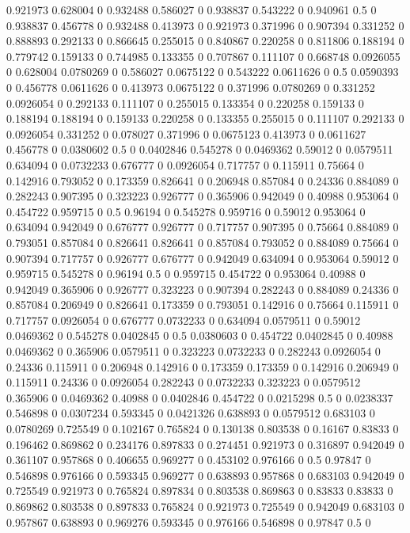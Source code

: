 0.921973 0.628004 0
0.932488 0.586027 0
0.938837 0.543222 0
0.940961 0.5 0
0.938837 0.456778 0
0.932488 0.413973 0
0.921973 0.371996 0
0.907394 0.331252 0
0.888893 0.292133 0
0.866645 0.255015 0
0.840867 0.220258 0
0.811806 0.188194 0
0.779742 0.159133 0
0.744985 0.133355 0
0.707867 0.111107 0
0.668748 0.0926055 0
0.628004 0.0780269 0
0.586027 0.0675122 0
0.543222 0.0611626 0
0.5 0.0590393 0
0.456778 0.0611626 0
0.413973 0.0675122 0
0.371996 0.0780269 0
0.331252 0.0926054 0
0.292133 0.111107 0
0.255015 0.133354 0
0.220258 0.159133 0
0.188194 0.188194 0
0.159133 0.220258 0
0.133355 0.255015 0
0.111107 0.292133 0
0.0926054 0.331252 0
0.078027 0.371996 0
0.0675123 0.413973 0
0.0611627 0.456778 0
0.0380602 0.5 0
0.0402846 0.545278 0
0.0469362 0.59012 0
0.0579511 0.634094 0
0.0732233 0.676777 0
0.0926054 0.717757 0
0.115911 0.75664 0
0.142916 0.793052 0
0.173359 0.826641 0
0.206948 0.857084 0
0.24336 0.884089 0
0.282243 0.907395 0
0.323223 0.926777 0
0.365906 0.942049 0
0.40988 0.953064 0
0.454722 0.959715 0
0.5 0.96194 0
0.545278 0.959716 0
0.59012 0.953064 0
0.634094 0.942049 0
0.676777 0.926777 0
0.717757 0.907395 0
0.75664 0.884089 0
0.793051 0.857084 0
0.826641 0.826641 0
0.857084 0.793052 0
0.884089 0.75664 0
0.907394 0.717757 0
0.926777 0.676777 0
0.942049 0.634094 0
0.953064 0.59012 0
0.959715 0.545278 0
0.96194 0.5 0
0.959715 0.454722 0
0.953064 0.40988 0
0.942049 0.365906 0
0.926777 0.323223 0
0.907394 0.282243 0
0.884089 0.24336 0
0.857084 0.206949 0
0.826641 0.173359 0
0.793051 0.142916 0
0.75664 0.115911 0
0.717757 0.0926054 0
0.676777 0.0732233 0
0.634094 0.0579511 0
0.59012 0.0469362 0
0.545278 0.0402845 0
0.5 0.0380603 0
0.454722 0.0402845 0
0.40988 0.0469362 0
0.365906 0.0579511 0
0.323223 0.0732233 0
0.282243 0.0926054 0
0.24336 0.115911 0
0.206948 0.142916 0
0.173359 0.173359 0
0.142916 0.206949 0
0.115911 0.24336 0
0.0926054 0.282243 0
0.0732233 0.323223 0
0.0579512 0.365906 0
0.0469362 0.40988 0
0.0402846 0.454722 0
0.0215298 0.5 0
0.0238337 0.546898 0
0.0307234 0.593345 0
0.0421326 0.638893 0
0.0579512 0.683103 0
0.0780269 0.725549 0
0.102167 0.765824 0
0.130138 0.803538 0
0.16167 0.83833 0
0.196462 0.869862 0
0.234176 0.897833 0
0.274451 0.921973 0
0.316897 0.942049 0
0.361107 0.957868 0
0.406655 0.969277 0
0.453102 0.976166 0
0.5 0.97847 0
0.546898 0.976166 0
0.593345 0.969277 0
0.638893 0.957868 0
0.683103 0.942049 0
0.725549 0.921973 0
0.765824 0.897834 0
0.803538 0.869863 0
0.83833 0.83833 0
0.869862 0.803538 0
0.897833 0.765824 0
0.921973 0.725549 0
0.942049 0.683103 0
0.957867 0.638893 0
0.969276 0.593345 0
0.976166 0.546898 0
0.97847 0.5 0

